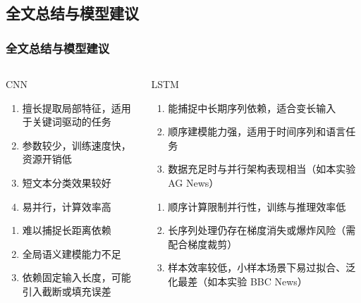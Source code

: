 \documentclass{模版}
\begin{document}
\subsection{全文总结与模型建议}
\begin{frame}\frametitle{全文总结与模型建议}
\centering
    \begin{columns}[T]
        \begin{block}{CNN}
    \fontsize{8pt}{9pt}\selectfont
    \begin{enumerate}
        \item 擅长提取局部特征，适用于关键词驱动的任务
        \item 参数较少，训练速度快，资源开销低
        \item 短文本分类效果较好
        \item 易并行，计算效率高
    \end{enumerate}
    \begin{enumerate}
        \item 难以捕捉长距离依赖
        \item 全局语义建模能力不足
        \item 依赖固定输入长度，可能引入截断或填充误差
    \end{enumerate}
\end{block}

\begin{block}{LSTM}
    \fontsize{8pt}{9pt}\selectfont
    \begin{enumerate}
        \item 能捕捉中长期序列依赖，适合变长输入
        \item 顺序建模能力强，适用于时间序列和语言任务
        \item 数据充足时与并行架构表现相当（如本实验 AG News）
    \end{enumerate}
    \begin{enumerate}
        \item 顺序计算限制并行性，训练与推理效率低
        \item 长序列处理仍存在梯度消失或爆炸风险（需配合梯度裁剪）
        \item 样本效率较低，小样本场景下易过拟合、泛化最差（如本实验 BBC News）
    \end{enumerate}
\end{block}


\end{columns}
\end{frame}
\end{document}

